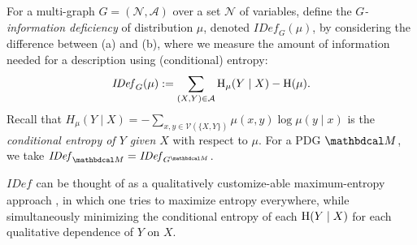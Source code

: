 \documentclass{article}
\newcommand{\V}{\mathcal V}
\newcommand{\N}{\mathcal N}
\newcommand{\Ed}{\mathcal A}
\newcommand{\ed}[3]{#2
	\overset{\smash{\mskip-5mu\raisebox{-1pt}{$\scriptscriptstyle
				#1$}}}{\rightarrow} #3}
\newcommand{\dg}[1]{\mathbdcal #1}
\newcommand{\IDef}[1]{\mathit{IDef}_{#1}}
\begin{document}
\begin{defn}\label{def:info-deficiency}
	For a multi-graph $G = (\N, \Ed)$ over a set $\N$ of variables,
	define the \emph{$G$-information deficiency}
	of distribution $\mu$, denoted $\IDef{G}(\mu)$,
	by considering the difference between (a) and (b), 
	where we measure the amount of information needed for a description
	using (conditional) entropy: 
	\begin{equation}
		\IDef{G}(\mu) := \sum_{(X,Y) \in \Ed} \H_\mu(Y\mid X) - \H(\mu). 
		\label{eqn:alt-extra}
	\end{equation}
	Recall that $H_\mu(Y\mid X) = - \sum_{x,y \in \V(\{X,Y\})} \mu(x,y) \log \mu(y\mid x)$ is the
	\emph{conditional entropy of $Y$ given $X$} with respect to $\mu$.
	For a PDG ${\dg M}$, we take $\IDef{\dg M} = \IDef{G^{\dg M}}$.         
\end{defn}

$\IDef{}$ can be thought of as a qualitatively customize-able maximum-entropy approach \cite{Jaynes57}, in which one tries to maximize entropy everywhere, while simultaneously minimizing the conditional entropy of each $\mathrm{H}(Y \mid X)$ for each qualitative dependence of $Y$ on $X$.
\end{document}
